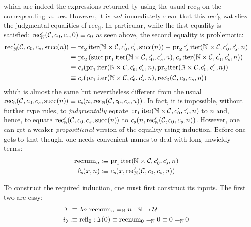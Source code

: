 which are indeed the expressions returned by using the usual $\text{rec}_{\mathbb{N}}$ on the corresponding values. However, it is \textit{not} immediately clear that this $\text{rec}'_{\mathbb{N}}$ satisfies the judgmental equalities of $\text{rec}_{\mathbb{N}}$. In particular, while the first equality is satisfied: $\text{rec}'_{\mathbb{N}}(\mathcal{C}, c_{0}, c_{s}, 0) \equiv c_{0}$ as seen above, the second equality is problematic:
\begin{align*}
	\text{rec}'_{\mathbb{N}}(\mathcal{C}, c_{0}, c_{s}, \text{succ}(n)) &\equiv \text{pr}_{2}\,\text{iter}(\mathbb{N} \times \mathcal{C}, c'_{0}, c'_{s}, \text{succ}(n)) \equiv \text{pr}_{2}\,c'_{s}\,\text{iter}(\mathbb{N} \times \mathcal{C}, c'_{0}, c'_{s}, n) \\
	&\equiv \text{pr}_{2}\,(\text{succ}\,\text{pr}_{1}\,\text{iter}(\mathbb{N} \times \mathcal{C}, c'_{0}, c'_{s}, n), c_{s}\,\text{iter}(\mathbb{N} \times \mathcal{C}, c'_{0}, c'_{s}, n)) \\
	&\equiv c_{s}(\text{pr}_{1}\,\text{iter}(\mathbb{N} \times \mathcal{C}, c'_{0}, c'_{s}, n),\text{pr}_{2}\,\text{iter}(\mathbb{N} \times \mathcal{C}, c'_{0}, c'_{s}, n)) \\
	&\equiv c_{s}(\text{pr}_{1}\,\text{iter}(\mathbb{N} \times \mathcal{C}, c'_{0}, c'_{s}, n),\text{rec}'_{\mathbb{N}}(\mathcal{C}, c_{0}, c_{s}, n))
\end{align*}
which is almost the same but nevertheless different from the usual $\text{rec}_{\mathbb{N}}(\mathcal{C}, c_{0}, c_{s}, \text{succ}(n)) \equiv c_{s}(n, \text{rec}_{\mathbb{N}}(\mathcal{C}, c_{0}, c_{s}, n))$. In fact, it is impossible, without further type rules, to \textit{judgmentally} equate $\text{pr}_{1}\,\text{iter}(\mathbb{N} \times \mathcal{C}, c'_{0}, c'_{s}, n)$ to $n$ and, hence, to equate $\text{rec}'_{\mathbb{N}}(\mathcal{C}, c_{0}, c_{s}, \text{succ}(n))$ to $c_{s}(n, \text{rec}'_{\mathbb{N}}(\mathcal{C}, c_{0}, c_{s}, n))$. However, one can get a weaker \textit{propositional} version of the equality using induction. Before one gets to that though, one needs convenient names to deal with long unwieldy terms:
\begin{align*}
	\text{recnum}_{n} &:\equiv \text{pr}_{1}\,\text{iter}(\mathbb{N} \times \mathcal{C}, c'_{0}, c'_{s}, n) \\
	\hat{c}_{s}(x,n) &:\equiv c_{s}(x,\text{rec}'_{\mathbb{N}}(\mathcal{C}, c_{0}, c_{s}, n))
\end{align*}

To construct the required induction, one must first construct its inputs. The first two are easy:
\begin{align*}
	\mathcal{I} &:\equiv \lambda n.\text{recnum}_{n} =_{\mathbb{N}} n : \mathbb{N} \to \mathcal{U} \\
	i_{0} &:\equiv \text{refl}_{0} : \mathcal{I}(0) \equiv \text{recnum}_{0} =_{\mathbb{N}} 0 \equiv 0 =_{\mathbb{N}} 0
\end{align*}

